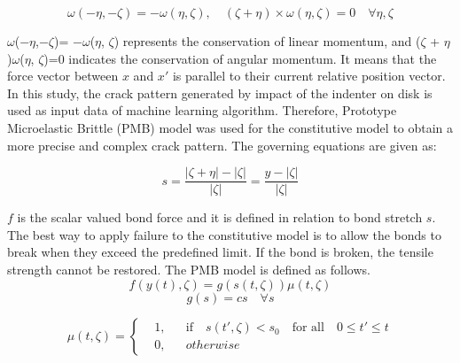 \begin{equation}
\omega(-\eta,-\zeta)= -\omega(\eta, \zeta),\quad(\zeta + \eta)\times\omega(\eta, \zeta)=0 \quad\forall\eta,\zeta
\end{equation}

$\omega$($-\eta$,$-\zeta$)= $-\omega$($\eta$, $\zeta$) represents the conservation of linear momentum, and ($\zeta$ + $\eta$)\times$\omega$($\eta$, $\zeta$)=0 indicates the conservation of angular momentum. It means that the force vector between $x$ and ${x'}$ is parallel to their current relative position vector. In this study, the crack pattern generated by impact of the indenter on disk is used as input data of machine learning algorithm. Therefore, Prototype Microelastic Brittle (PMB) model \cite{Ref4} was used for the constitutive model to obtain a more precise and complex crack pattern. The governing equations are given as: 

\begin{equation}
s=\frac{|\zeta+\eta|-|\zeta|}{|\zeta|}=\frac{y-|\zeta|}{|\zeta|}
\end{equation}

$f$ is the scalar valued bond force and it is defined in relation to bond stretch $s$. The best way to apply failure to the constitutive model is to allow the bonds to break when they exceed the predefined limit. If the bond is broken, the tensile strength cannot be restored. The PMB model is defined as follows.
\begin{equation}
f(y(t),\zeta)=g(s(t,\zeta))\mu(t,\zeta)
\end{equation}
\begin{equation}
g(s)=cs \quad\forall s
\end{equation}

\begin{equation}
  \mu(t,\zeta) = \left \{
  \begin{aligned}
    &1, && \textrm{if} \quad s(t',\zeta)<s_0 \quad \textrm{for all} \quad 0 \leq t' \leq t\\
    &0, && otherwise
  \end{aligned} \right.
\end{equation}


